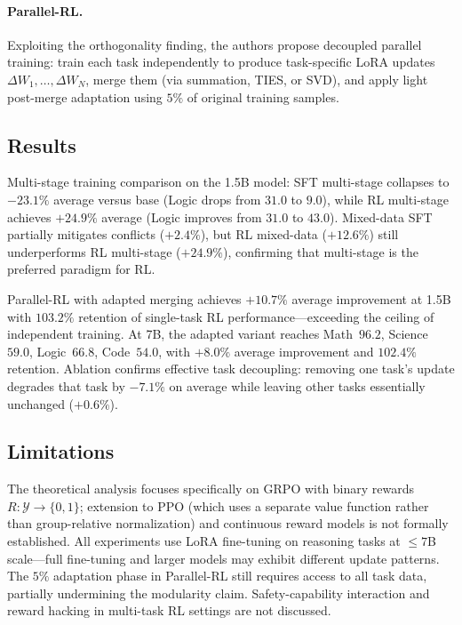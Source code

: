 \documentclass[11pt,a4paper]{article}
\begin{document}
\paragraph{Parallel-RL.} Exploiting the orthogonality finding, the authors propose decoupled parallel training: train each task independently to produce task-specific LoRA updates $\Delta W_1, \ldots, \Delta W_N$, merge them (via summation, TIES, or SVD), and apply light post-merge adaptation using $5\%$ of original training samples.

\subsection{Results}

Multi-stage training comparison on the 1.5B model: SFT multi-stage collapses to $-23.1\%$ average versus base (Logic drops from $31.0$ to $9.0$), while RL multi-stage achieves $+24.9\%$ average (Logic improves from $31.0$ to $43.0$). Mixed-data SFT partially mitigates conflicts ($+2.4\%$), but RL mixed-data ($+12.6\%$) still underperforms RL multi-stage ($+24.9\%$), confirming that multi-stage is the preferred paradigm for RL.

Parallel-RL with adapted merging achieves $+10.7\%$ average improvement at 1.5B with $103.2\%$ retention of single-task RL performance---exceeding the ceiling of independent training. At 7B, the adapted variant reaches Math~$96.2$, Science~$59.0$, Logic~$66.8$, Code~$54.0$, with $+8.0\%$ average improvement and $102.4\%$ retention. Ablation confirms effective task decoupling: removing one task's update degrades that task by $-7.1\%$ on average while leaving other tasks essentially unchanged ($+0.6\%$).

\subsection{Limitations}

The theoretical analysis focuses specifically on GRPO with binary rewards $R: \mathcal{Y} \to \{0,1\}$; extension to PPO (which uses a separate value function rather than group-relative normalization) and continuous reward models is not formally established. All experiments use LoRA fine-tuning on reasoning tasks at $\leq 7$B scale---full fine-tuning and larger models may exhibit different update patterns. The $5\%$ adaptation phase in Parallel-RL still requires access to all task data, partially undermining the modularity claim. Safety-capability interaction and reward hacking in multi-task RL settings are not discussed.
\end{document}
